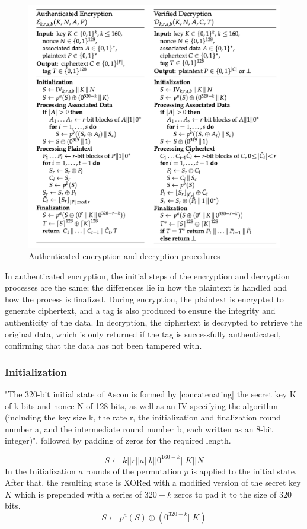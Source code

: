 \begin{figure}[H]
    \centering
    \includegraphics[width=1\textwidth]{figures/alg.png}
    \caption{Authenticated encryption and decryption procedures \cite{DBLP:journals/joc/DobraunigEMS21}}
    \label{fig:procedure}
\end{figure}

In authenticated encryption, the initial steps of the encryption and decryption processes are the same; the differences lie in how the plaintext is handled and how the process is finalized. During encryption, the plaintext is encrypted to generate ciphertext, and a tag is also produced to ensure the integrity and authenticity of the data. In decryption, the ciphertext is decrypted to retrieve the original data, which is only returned if the tag is successfully authenticated, confirming that the data has not been tampered with. \par

\subsubsection{Initialization}
"The 320-bit initial state of Ascon is formed by [concatenating] the secret key K of k bits and nonce N of 128 bits, as well as an IV specifying the algorithm (including the key size k, the rate r, the initialization and finalization round number a, and the intermediate round number b, each written as an 8-bit integer)", followed by padding of zeros for the required length. \par
$$S \leftarrow k || r || a || b || 0^{160-k} || K || N $$
In the Initialization $a$ rounds of the permutation $p$ is applied to the initial state. After that, the resulting state is XORed with a modified version of the secret key $K$ which is prepended with a series of $320-k$ zeros to pad it to the size of 320 bits. \cite{DBLP:journals/joc/DobraunigEMS21}
$$S \leftarrow p^a(S) \oplus (0^{320-k} || K)$$

